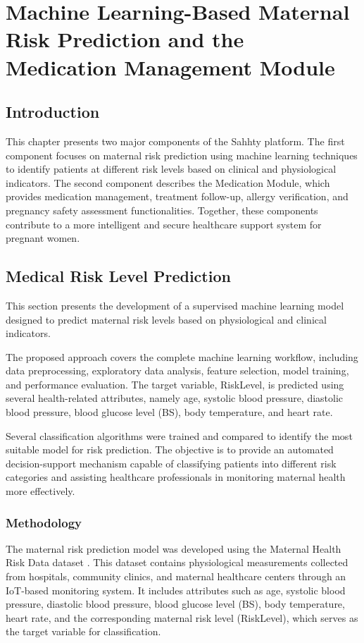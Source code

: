 \chapter{Machine Learning-Based Maternal Risk Prediction and the Medication Management Module}
\label{chap:MCMMC}
\section{Introduction}

This chapter presents two major components of the Sahhty platform. The first component focuses on maternal risk prediction using machine learning techniques to identify patients at different risk levels based on clinical and physiological indicators. The second component describes the Medication Module, which provides medication management, treatment follow-up, allergy verification, and pregnancy safety assessment functionalities. Together, these components contribute to a more intelligent and secure healthcare support system for pregnant women.


\section{Medical Risk Level Prediction}

This section presents the development of a supervised machine learning model designed to predict maternal risk levels based on physiological and clinical indicators.

The proposed approach covers the complete machine learning workflow, including data preprocessing, exploratory data analysis, feature selection, model training, and performance evaluation. The target variable, RiskLevel, is predicted using several health-related attributes, namely age, systolic blood pressure, diastolic blood pressure, blood glucose level (BS), body temperature, and heart rate.

Several classification algorithms were trained and compared to identify the most suitable model for risk prediction. The objective is to provide an automated decision-support mechanism capable of classifying patients into different risk categories and assisting healthcare professionals in monitoring maternal health more effectively.

\subsection{Methodology}

The maternal risk prediction model was developed using the Maternal Health Risk Data dataset \cite{maternal_health_dataset}. This dataset contains physiological measurements collected from hospitals, community clinics, and maternal healthcare centers through an IoT-based monitoring system. It includes attributes such as age, systolic blood pressure, diastolic blood pressure, blood glucose level (BS), body temperature, heart rate, and the corresponding maternal risk level (RiskLevel), which serves as the target variable for classification.

